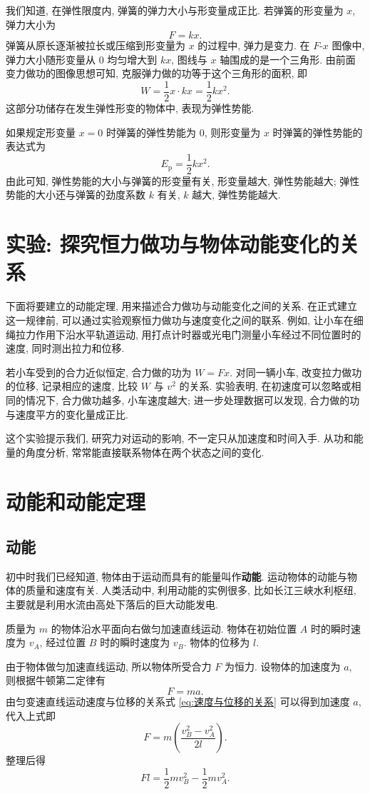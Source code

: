 \documentclass[UTF8,openany,fontset=fandol]{ctexbook}
\theoremstyle{chinesetextbook}
\begin{document}
我们知道, 在弹性限度内, 弹簧的弹力大小与形变量成正比. 若弹簧的形变量为 $x$, 弹力大小为
\[
F=kx.
\]
弹簧从原长逐渐被拉长或压缩到形变量为 $x$ 的过程中, 弹力是变力. 在 $F$-$x$ 图像中, 弹力大小随形变量从 0 均匀增大到 $kx$, 图线与 $x$ 轴围成的是一个三角形. 由前面变力做功的图像思想可知, 克服弹力做的功等于这个三角形的面积, 即
\[
W=\frac12 x\cdot kx=\frac12kx^2.
\]
这部分功储存在发生弹性形变的物体中, 表现为弹性势能.

如果规定形变量 $x=0$ 时弹簧的弹性势能为 0, 则形变量为 $x$ 时弹簧的弹性势能的表达式为
\[
E_\mathrm{p}=\frac12 k x^2.
\]
由此可知, 弹性势能的大小与弹簧的形变量有关, 形变量越大, 弹性势能越大; 弹性势能的大小还与弹簧的劲度系数 $k$ 有关, $k$ 越大, 弹性势能越大.
\section{实验: 探究恒力做功与物体动能变化的关系}
下面将要建立的动能定理, 用来描述合力做功与动能变化之间的关系. 在正式建立这一规律前, 可以通过实验观察恒力做功与速度变化之间的联系. 例如, 让小车在细绳拉力作用下沿水平轨道运动, 用打点计时器或光电门测量小车经过不同位置时的速度, 同时测出拉力和位移.

若小车受到的合力近似恒定, 合力做的功为 $W=Fx$. 对同一辆小车, 改变拉力做功的位移, 记录相应的速度, 比较 $W$ 与 $v^2$ 的关系. 实验表明, 在初速度可以忽略或相同的情况下, 合力做功越多, 小车速度越大; 进一步处理数据可以发现, 合力做的功与速度平方的变化量成正比.

这个实验提示我们, 研究力对运动的影响, 不一定只从加速度和时间入手. 从功和能量的角度分析, 常常能直接联系物体在两个状态之间的变化.
\section{动能和动能定理}
\subsection{动能}
初中时我们已经知道, 物体由于运动而具有的能量叫作\textbf{动能}. 运动物体的动能与物体的质量和速度有关. 人类活动中, 利用动能的实例很多, 比如长江三峡水利枢纽, 主要就是利用水流由高处下落后的巨大动能发电.

质量为 $m$ 的物体沿水平面向右做匀加速直线运动. 物体在初始位置 $A$ 时的瞬时速度为 $v_A$, 经过位置 $B$ 时的瞬时速度为 $v_B$. 物体的位移为 $l$.

由于物体做匀加速直线运动, 所以物体所受合力 $F$ 为恒力. 设物体的加速度为 $a$, 则根据牛顿第二定律有
\[
F=ma.
\]
由匀变速直线运动速度与位移的关系式 \eqref{eq:速度与位移的关系} 可以得到加速度 $a$, 代入上式即
\[
F=m\left(\frac{v_B^2-v_A^2}{2l}\right).
\]
整理后得
\begin{equation}\label{eq:动能定理前身}
Fl=\frac12 mv_B^2-\frac12 mv_A^2.
\end{equation}
\end{document}
